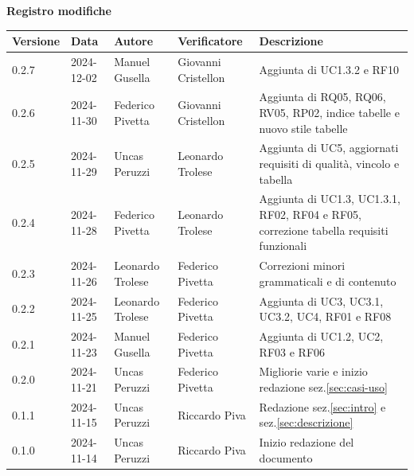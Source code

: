 \documentclass[11pt]{article}
\begin{document}
\centering\textbf{Registro modifiche}\\
\vspace{2mm}
\begin{tabularx}{\textwidth}{|l|l|l|l|X|}
\hline
\textbf{Versione} & \textbf{Data} & \textbf{Autore} & \textbf{Verificatore} & \textbf{Descrizione} \\
\hline
0.2.7 & 2024-12-02 & Manuel Gusella & Giovanni Cristellon & Aggiunta di UC1.3.2 e RF10 \\
\hline
0.2.6 & 2024-11-30 & Federico Pivetta & Giovanni Cristellon & Aggiunta di RQ05, RQ06, RV05, RP02, indice tabelle e nuovo stile tabelle \\
\hline
0.2.5 & 2024-11-29 & Uncas Peruzzi & Leonardo Trolese & Aggiunta di UC5, aggiornati requisiti di qualità, vincolo e tabella \\
\hline
0.2.4 & 2024-11-28 & Federico Pivetta & Leonardo Trolese & Aggiunta di UC1.3, UC1.3.1, RF02, RF04 e RF05, correzione tabella requisiti funzionali \\
\hline
0.2.3 & 2024-11-26 & Leonardo Trolese  & Federico Pivetta & Correzioni minori grammaticali e di contenuto \\
\hline
0.2.2 & 2024-11-25 & Leonardo Trolese  & Federico Pivetta & Aggiunta di UC3, UC3.1, UC3.2, UC4, RF01 e RF08 \\
\hline
0.2.1 & 2024-11-23 & Manuel Gusella  & Federico Pivetta & Aggiunta di UC1.2, UC2, RF03 e RF06\\
\hline
0.2.0 & 2024-11-21 & Uncas Peruzzi  & Federico Pivetta & Migliorie varie e inizio redazione sez.\ref{sec:casi-uso} \\
\hline
0.1.1 & 2024-11-15 & Uncas Peruzzi  & Riccardo Piva & Redazione sez.\ref{sec:intro} e sez.\ref{sec:descrizione} \\
\hline
0.1.0 & 2024-11-14 & Uncas Peruzzi  & Riccardo Piva & Inizio redazione del documento\\
\hline
\end{tabularx}

\newpage
\tableofcontents
\newpage
\listoffigures
\newpage
\listoftables
\end{document}

